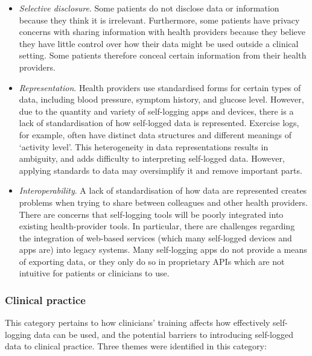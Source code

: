 \documentclass{sigchi}
\begin{document}
\begin{itemize}
    \item \textit{Selective disclosure}. Some patients do not disclose data or information because they think it is irrelevant. Furthermore, some patients have privacy concerns with sharing information with health providers because they believe they have little control over how their data might be used outside a clinical setting. Some patients therefore conceal certain information from their health providers.
    
    \item \textit{Representation}. Health providers use standardised forms for certain types of data, including blood pressure, symptom history, and glucose level. However, due to the quantity and variety of self-logging apps and devices, there is a lack of standardisation of how self-logged data is represented.  Exercise logs, for example, often have distinct data structures and different meanings of `activity level'.  This heterogeneity in data representations results in ambiguity, and adds difficulty to interpreting self-logged data. However, applying standards to data may oversimplify it and remove important parts.
    
    \item \textit{Interoperability}. A lack of standardisation of how data are represented creates problems when trying to share between colleagues and other health providers. There are concerns that self-logging tools will be poorly integrated into existing health-provider tools. In particular, there are challenges regarding the integration of web-based services (which many self-logged devices and apps are) into legacy systems. Many self-logging apps do not provide a means of exporting data, or they only do so in proprietary APIs which are not intuitive for patients or clinicians to use.
\end{itemize}

\subsubsection{Clinical practice}

This category pertains to how clinicians' training affects how effectively self-logging data can be used, and the potential barriers to introducing self-logged data to clinical practice. Three themes were identified in this category:
\end{document}
